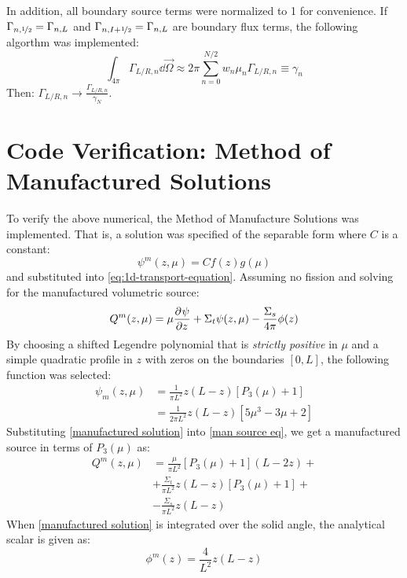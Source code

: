 \documentclass{NE515}
\theoremstyle{definition}
\begin{document}
    In addition, all boundary source terms were normalized to 1 for convenience.
    If $\Gamma_{n,\nicefrac{1}{2}}=\Gamma_{n,L}$ and $\Gamma_{n,I+\nicefrac{1}{2}}=\Gamma_{n,L}$ are boundary flux terms, the following algorthm was implemented:
    \begin{equation}
        \label{numerical flux scaling}
        \int_{4\pi }^{} \Gamma_{L/R,n}\dd \vec{\Omega} \approx 2\pi \sum_{n=0}^{N/2} w_n\mu_n \Gamma_{L/R,n}\equiv \gamma_n
    \end{equation}
    Then: $\Gamma_{L/R,n}\rightarrow \frac{\Gamma_{L/R,n}}{\gamma_N}$.


    \section{Code Verification: Method of Manufactured Solutions}
    To verify the above numerical, the Method of Manufacture Solutions was implemented.
    That is, a solution was specified of the separable form where $C$ is a constant:
    \begin{equation}
        \psi^m (z,\mu) = C f(z) g(\mu)
    \end{equation}
    and substituted into \cref{eq:1d-transport-equation}.
    Assuming no fission and solving for the manufactured volumetric source:
    \begin{equation}
        \label{man source eq}
        Q^m(z,\mu) = \mu \pdv[]{\psi }{z}+\Sigma_t\psi(z,\mu)-\frac{\Sigma_s}{4\pi}\phi(z)
    \end{equation}
    By choosing a shifted Legendre polynomial that is \textit{strictly positive} in $\mu$ and a simple quadratic profile in $z$ with zeros on the boundaries $[0,L]$, the following function was selected:
    \begin{equation}
        \label{manufactured solution}
        \begin{split}
            \psi_{m}(z,\mu)&=\frac{1}{\pi L^2}z(L-z)\left[ P_3 (\mu)+1\right]\\
            &= \frac{1}{2\pi L^2}z(L-z)\left[ 5\mu^3-3\mu+2\right]
        \end{split}
    \end{equation}
    Substituting \cref{manufactured solution} into \cref{man source eq}, we get a manufactured source in terms of $P_3(\mu)$ as:
    \begin{equation}
        \begin{split}
            Q^m(z,\mu)&=\frac{\mu }{\pi L^2}\left[ P_3(\mu)+1 \right]\left( L-2z \right) +\\
            &+\frac{\Sigma_t}{\pi L^2}z\left( L-z \right)\left[ P_3(\mu)+1 \right]+\\
            &-\frac{\Sigma_s}{\pi L^2}z\left( L-z \right)
        \end{split}
    \end{equation}
    When \cref{manufactured solution} is integrated over the solid angle, the analytical scalar is given as:
    \begin{equation}
        \phi^m(z)=\frac{4}{L^2}z\left( L-z \right)
    \end{equation}
\end{document}
